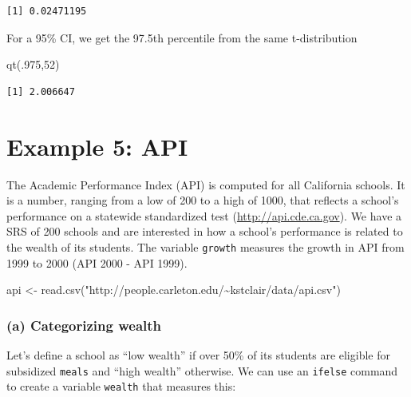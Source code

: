 \documentclass[
]{book}
\newenvironment{Shaded}{\begin{snugshade}}{\end{snugshade}}
\newcommand{\DecValTok}[1]{\textcolor[rgb]{0.00,0.00,0.81}{#1}}
\newcommand{\FunctionTok}[1]{\textcolor[rgb]{0.00,0.00,0.00}{#1}}
\newcommand{\NormalTok}[1]{#1}
\newcommand{\OtherTok}[1]{\textcolor[rgb]{0.56,0.35,0.01}{#1}}
\newcommand{\StringTok}[1]{\textcolor[rgb]{0.31,0.60,0.02}{#1}}
\begin{document}
\begin{verbatim}
[1] 0.02471195
\end{verbatim}

For a 95\% CI, we get the 97.5th percentile from the same t-distribution

\begin{Shaded}
\begin{Highlighting}[]
\FunctionTok{qt}\NormalTok{(.}\DecValTok{975}\NormalTok{,}\DecValTok{52}\NormalTok{)}
\end{Highlighting}
\end{Shaded}

\begin{verbatim}
[1] 2.006647
\end{verbatim}

\hypertarget{example-5-api}{%
\section{Example 5: API}\label{example-5-api}}

The Academic Performance Index (API) is computed for all California schools. It is a number, ranging from a low of 200 to a high of 1000, that reflects a school's performance on a statewide standardized test (\url{http://api.cde.ca.gov}). We have a SRS of 200 schools and are interested in how a school's performance is related to the wealth of its students. The variable \texttt{growth} measures the growth in API from 1999 to 2000 (API 2000 - API 1999).

\begin{Shaded}
\begin{Highlighting}[]
\NormalTok{api }\OtherTok{\textless{}{-}} \FunctionTok{read.csv}\NormalTok{(}\StringTok{"http://people.carleton.edu/\textasciitilde{}kstclair/data/api.csv"}\NormalTok{)}
\end{Highlighting}
\end{Shaded}

\hypertarget{a-categorizing-wealth}{%
\subsubsection{(a) Categorizing wealth}\label{a-categorizing-wealth}}

Let's define a school as ``low wealth'' if over 50\% of its students are eligible for subsidized \texttt{meals} and ``high wealth'' otherwise. We can use an \texttt{ifelse} command to create a variable \texttt{wealth} that measures this:
\end{document}
